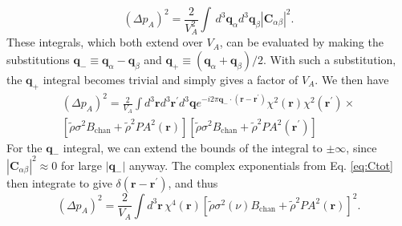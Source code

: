\documentclass[twocolumn,aps,prd,nofootinbib,showpacs]{revtex4-1}
\begin{document}
\begin{equation}
\label{eq:Binning}
(\Delta p_A)^2 = \frac{2}{V_A^2} \int \,d^3 \mathbf{q}_\alpha d^3 \mathbf{q}_\beta | \mathbf{C}_{\alpha \beta} |^2  .
\end{equation}
These integrals, which both extend over $V_A$, can be evaluated by making the substitutions $\mathbf{q}_- \equiv \mathbf{q}_\alpha - \mathbf{q}_\beta$ and $\mathbf{q}_+ \equiv (\mathbf{q}_\alpha + \mathbf{q}_\beta)/2$.  With such a substitution, the $\mathbf{q}_+$ integral becomes trivial and simply gives a factor of $V_A$.  We then have
\begin{eqnarray}
(\Delta p_A)^2 = \frac{2}{V_A} \int d^3\mathbf{r} d^3\mathbf{r}^\prime d^3 \mathbf{q} e^{-i 2\pi \mathbf{q}_- \cdot (\mathbf{r} - \mathbf{r}^\prime)}  \chi^2 (\mathbf{r}) \chi^2 (\mathbf{r}^\prime) \times \nonumber \\
 \left[ \tilde{\rho} \sigma^2 B_\textrm{chan}  + \tilde{\rho}^2 P A^2 (\mathbf{r}) \right] \left[ \tilde{\rho} \sigma^2 B_\textrm{chan}  + \tilde{\rho}^2 P A^2 (\mathbf{r}^\prime) \right] \qquad
\end{eqnarray}
For the $\mathbf{q}_-$ integral, we can extend the bounds of the integral to $\pm \infty$, since $|\mathbf{C}_{\alpha \beta}|^2 \approx 0$ for large $|\mathbf{q}_-|$ anyway.  The complex exponentials from Eq. \eqref{eq:Ctot} then integrate to give $\delta(\mathbf{r} - \mathbf{r}^\prime)$, and thus
\begin{equation}
(\Delta p_A)^2 = \frac{2}{V_A} \int d^3 \mathbf{r} \, \chi^4 (\mathbf{r}) \left[ \tilde{\rho} \sigma^2(\nu) B_\textrm{chan}  + \tilde{\rho}^2 P A^2 (\mathbf{r}) \right]^2.
\end{equation}
\end{document}
